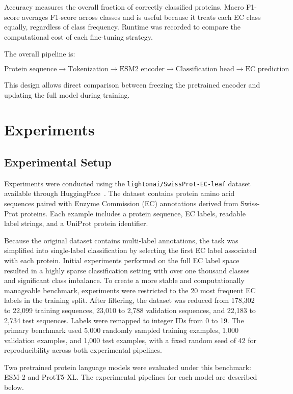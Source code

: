 \documentclass{article}
\begin{document}
Accuracy measures the overall fraction of correctly classified proteins. Macro F1-score averages F1-score across classes and is useful because it treats each EC class equally, regardless of class frequency. Runtime was recorded to compare the computational cost of each fine-tuning strategy.

The overall pipeline is:

\[
\text{Protein sequence} \rightarrow \text{Tokenization} \rightarrow \text{ESM2 encoder} \rightarrow \text{Classification head} \rightarrow \text{EC prediction}
\]

This design allows direct comparison between freezing the pretrained encoder and updating the full model during training.
\section{Experiments}

\subsection{Experimental Setup}

Experiments were conducted using the \texttt{lightonai/SwissProt-EC-leaf} dataset available through HuggingFace~\cite{huggingface}. The dataset contains protein amino acid sequences paired with Enzyme Commission (EC) annotations derived from Swiss-Prot proteins. Each example includes a protein sequence, EC labels, readable label strings, and a UniProt protein identifier.

Because the original dataset contains multi-label annotations, the task was simplified into single-label classification by selecting the first EC label associated with each protein. Initial experiments performed on the full EC label space resulted in a highly sparse classification setting with over one thousand classes and significant class imbalance. To create a more stable and computationally manageable benchmark, experiments were restricted to the 20 most frequent EC labels in the training split. After filtering, the dataset was reduced from 178,302 to 22,099 training sequences, 23,010 to 2,788 validation sequences, and 22,183 to 2,734 test sequences. Labels were remapped to integer IDs from 0 to 19. The primary benchmark used 5,000 randomly sampled training examples, 1,000 validation examples, and 1,000 test examples, with a fixed random seed of 42 for reproducibility across both experimental pipelines.

Two pretrained protein language models were evaluated under this benchmark: ESM-2 and ProtT5-XL. The experimental pipelines for each model are described below.
\end{document}
